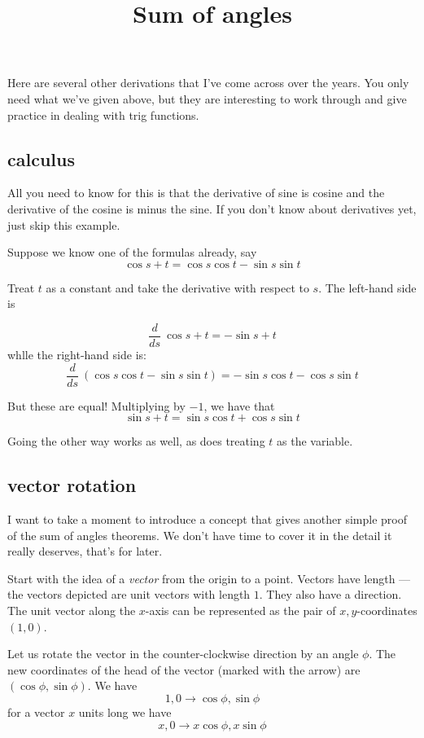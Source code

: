 \documentclass[11pt, oneside]{article}
\title{Sum of angles}
\date{}
\begin{document}
\maketitle
\Large


Here are several other derivations that I've come across over the years.  You only need what we've given above, but they are interesting to work through and give practice in dealing with trig functions.

\subsection*{calculus}

All you need to know for this is that the derivative of sine is cosine and the derivative of the cosine is minus the sine.  If you don't know about derivatives yet, just skip this example.

Suppose we know one of the formulas already, say
\[ \cos s + t = \cos s \cos t - \sin s \sin t \]

Treat $t$ as a constant and take the derivative with respect to $s$.  The left-hand side is

\[ \frac{d}{ds} \ \cos s + t = - \sin s + t \]
whlle the right-hand side is:
\[ \frac{d}{ds} \ ( \cos s \cos t - \sin s \sin t) = - \sin s \cos t - \cos s \sin t \]

But these are equal!  Multiplying by $-1$, we have that
\[ \sin s + t = \sin s \cos t + \cos s \sin t \]

Going the other way works as well, as does treating $t$ as the variable.

\subsection*{vector rotation}

I want to take a moment to introduce a concept that gives another simple proof of the sum of angles theorems.  We don't have time to cover it in the detail it really deserves, that's for later.

Start with the idea of a \emph{vector} from the origin to a point.  Vectors have length --- the vectors depicted are unit vectors with length $1$.  They also have a direction.  The unit vector along the $x$-axis can be represented as the pair of $x,y$-coordinates $(1,0)$.

Let us rotate the vector in the counter-clockwise direction by an angle $\phi$.  The new coordinates of the head of the vector (marked with the arrow) are $(\cos \phi, \sin \phi)$.  We have
\[ 1, 0 \rightarrow \cos \phi, \sin \phi \]
for a vector $x$ units long we have
\[ x, 0 \rightarrow x \cos \phi, x \sin \phi \]
 
\end{document}
